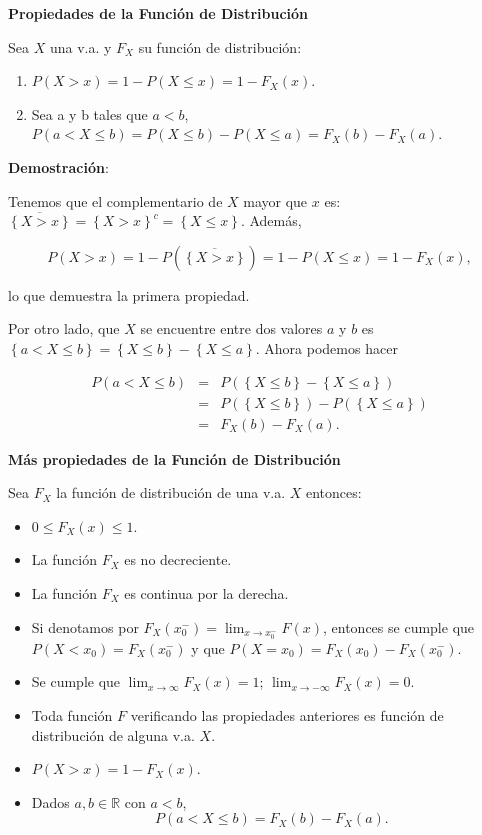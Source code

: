 \documentclass[
  letterpaper,
  DIV=11,
  numbers=noendperiod]{scrreprt}
\providecommand{\tightlist}{%
  \setlength{\itemsep}{0pt}\setlength{\parskip}{0pt}}\usepackage{longtable,booktabs,array}
\begin{document}
\textbf{Propiedades de la Función de Distribución}

Sea \(X\) una v.a. y \(F_{X}\) su función de distribución:

\begin{enumerate}
\def\labelenumi{\arabic{enumi}.}
\tightlist
\item
  \(P(X>x)=1-P(X\leq x)=1-F_{X}(x).\)
\item
  Sea a y b tales que \(a<b\),
  \(P(a<X\leq b)=P(X\leq b)-P(X\leq a)=F_{X}(b)-F_{X}(a).\)
\end{enumerate}

\textbf{Demostración}:

Tenemos que el complementario de \(X\) mayor que \(x\) es:
\(\overline{\left\{X>x\right\}}=\left\{X>x\right\}^c=\left\{X\leq x\right\}\).
Además,

\[P(X>x)=1-P(\overline{\left\{X>x\right\}})=1-P(X\leq x)=1-F_{X}(x),\]

lo que demuestra la primera propiedad.

Por otro lado, que \(X\) se encuentre entre dos valores \(a\) y \(b\) es
\(\left\{a< X \leq b\right\}= \left\{X\leq b\right\}-\left\{X\leq a\right\}\).
Ahora podemos hacer

\begin{eqnarray*}
P(a<X\leq b)&=&P(\left\{X\leq b\right\}-\left\{X\leq a\right\})\\
&=& P(\left\{X\leq b\right\})-P(\left\{X\leq a\right\})\\
&=& F_{X}(b)-F_{X}(a).
\end{eqnarray*}

\textbf{Más propiedades de la Función de Distribución}

Sea \(F_{X}\) la función de distribución de una v.a. \(X\) entonces:

\begin{itemize}
\tightlist
\item
  \(0\leq F_{X}(x)\leq 1\).
\item
  La función \(F_{X}\) es no decreciente.
\item
  La función \(F_{X}\) es continua por la derecha.
\item
  Si denotamos por
  \(F_X(x_0^{-})=\displaystyle \lim_{x\to x_0^{-}} F(x)\), entonces se
  cumple que \(P(X< x_0)=F_X(x_0^{-})\) y que
  \(P(X=x_0)=F_X(x_0)-F_X(x_0^{-})\).
\item
  Se cumple que \(\displaystyle \lim_{x\to\infty} F_{X}(x)=1\);
  \(\displaystyle \lim_{x\to-\infty}F_{X}(x)=0\).
\item
  Toda función \(F\) verificando las propiedades anteriores es función
  de distribución de alguna v.a. \(X\).
\item
  \(P(X>x)=1-F_{X}(x)\).
\item
  Dados \(a,b\in \mathbb{R}\) con \(a<b\),
  \[P(a<X\leq b)=F_{X}(b)-F_{X}(a).\]
\end{itemize}
\end{document}
